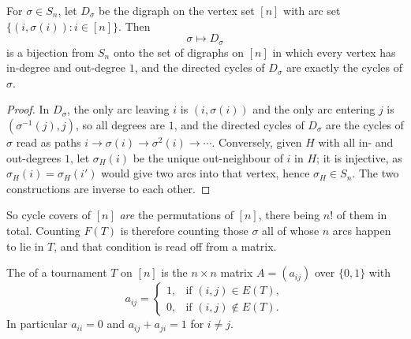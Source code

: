 \begin{lemma}\label{lem:perm-cycle-cover}
    For \(\sigma \in S_n\), let \(D_\sigma\) be the digraph on the vertex set \([n]\) with arc set \(\{(i, \sigma(i)) : i \in [n]\}\). Then
    \[
        \sigma \longmapsto D_\sigma
    \]
    is a bijection from \(S_n\) onto the set of digraphs on \([n]\) in which every vertex has in-degree and out-degree \(1\), and the directed cycles of \(D_\sigma\) are exactly the cycles of \(\sigma\).
\end{lemma}

\begin{proof}
    In \(D_\sigma\), the only arc leaving \(i\) is \((i, \sigma(i))\) and the only arc entering \(j\) is \((\sigma^{-1}(j), j)\), so all degrees are \(1\), and the directed cycles of \(D_\sigma\) are the cycles of \(\sigma\) read as paths \(i \to \sigma(i) \to \sigma^2(i) \to \cdots\). Conversely, given \(H\) with all in- and out-degrees \(1\), let \(\sigma_H(i)\) be the unique out-neighbour of \(i\) in \(H\); it is injective, as \(\sigma_H(i) = \sigma_H(i')\) would give two arcs into that vertex, hence \(\sigma_H \in S_n\). The two constructions are inverse to each other.
\end{proof}

So cycle covers of \([n]\) \emph{are} the permutations of \([n]\), there being \(n!\) of them in total. Counting \(F(T)\) is therefore counting those \(\sigma\) all of whose \(n\) arcs happen to lie in \(T\), and that condition is read off from a matrix.

\begin{definition}\label{def:adjacency}
    The  of a tournament \(T\) on \([n]\) is the \(n \times n\) matrix \(A = (a_{ij})\) over \(\{0,1\}\) with
    \[
        a_{ij} =
        \begin{cases}
            1, & \text{if } (i,j) \in E(T), \\
            0, & \text{if } (i,j) \notin E(T).
        \end{cases}
    \]
    In particular \(a_{ii} = 0\) and \(a_{ij} + a_{ji} = 1\) for \(i \ne j\).
\end{definition}

